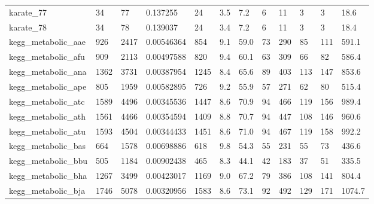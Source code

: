 \begin{longtable}{llllllllllll}
 karate\_77                                          & 34         & 77        & 0.137255    & 24    & 3.5    & 7.2    & 6     & 11     & 3      & 3      & 18.6    \\
 karate\_78                                          & 34         & 78        & 0.139037    & 24    & 3.4    & 7.2    & 6     & 11     & 3      & 3      & 18.4    \\
 kegg\_metabolic\_aae                                 & 926        & 2417      & 0.00546364  & 854   & 9.1    & 59.0   & 73    & 290    & 85     & 111    & 591.1   \\
 kegg\_metabolic\_afu                                 & 909        & 2113      & 0.00497588  & 820   & 9.4    & 60.1   & 63    & 309    & 66     & 82     & 586.4   \\
 kegg\_metabolic\_ana                                 & 1362       & 3731      & 0.00387954  & 1245  & 8.4    & 65.6   & 89    & 403    & 113    & 147    & 853.6   \\
 kegg\_metabolic\_ape                                 & 805        & 1959      & 0.00582895  & 726   & 9.2    & 55.9   & 57    & 271    & 62     & 80     & 515.4   \\
 kegg\_metabolic\_atc                                 & 1589       & 4496      & 0.00345536  & 1447  & 8.6    & 70.9   & 94    & 466    & 119    & 156    & 989.4   \\
 kegg\_metabolic\_ath                                 & 1561       & 4466      & 0.00354594  & 1409  & 8.8    & 70.7   & 94    & 447    & 108    & 146    & 960.6   \\
 kegg\_metabolic\_atu                                 & 1593       & 4504      & 0.00344433  & 1451  & 8.6    & 71.0   & 94    & 467    & 119    & 158    & 992.2   \\
 kegg\_metabolic\_bas                                 & 664        & 1578      & 0.00698886  & 618   & 9.8    & 54.3   & 55    & 231    & 55     & 73     & 436.6   \\
 kegg\_metabolic\_bbu                                 & 505        & 1184      & 0.00902438  & 465   & 8.3    & 44.1   & 42    & 183    & 37     & 51     & 335.5   \\
 kegg\_metabolic\_bha                                 & 1267       & 3499      & 0.00423017  & 1169  & 9.0    & 67.2   & 79    & 386    & 108    & 141    & 804.4   \\
 kegg\_metabolic\_bja                                 & 1746       & 5078      & 0.00320956  & 1583  & 8.6    & 73.1   & 92    & 492    & 129    & 171    & 1074.7  \\

\end{longtable}
